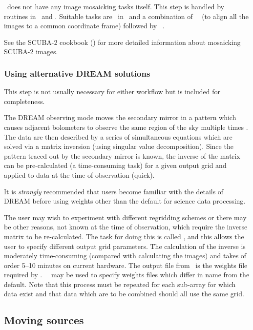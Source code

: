 \documentclass[oneside,11pt]{starlink}
\begin{document}
\SMURF\ does not have any image mosaicking tasks itself. This step is
handled by routines in \KAPPA\ and \CCDPACK. Suitable tasks are
\wcsmosaic\ in \KAPPA\ and a combination of \KAPPA\ \wcsalign\ (to
align all the images to a common coordinate frame) followed by
\CCDPACK\ \makemos.

See the SCUBA-2 cookbook (\SMURFcook) for more detailed information
about mosaicking SCUBA-2 images.

\subsubsection{Using alternative DREAM solutions\label{se:dream}}

This step is not usually necessary for either workflow but is included
for completeness.

The DREAM observing mode moves the secondary mirror in a pattern which
causes adjacent bolometers to observe the same region of the sky
multiple times \cite{scuba2,dream}. The data are then described by a
series of simultaneous equations which are solved via a matrix
inversion (using singular value decomposition). Since the pattern
traced out by the secondary mirror is known, the inverse of the matrix
can be pre-calculated (a time-consuming task) for a given output grid
and applied to data at the time of observation (quick).

It is \emph{strongly} recommended that users become familiar with the
details of DREAM \cite{dream} before using weights other than the
default for science data processing.

The user may wish to experiment with different regridding schemes or
there may be other reasons, not known at the time of observation,
which require the inverse matrix to be re-calculated. The task for
doing this is called \dreamweights, and this allows the user to
specify different output grid parameters. The calculation of the
inverse is moderately time-consuming (compared with calculating the
images) and takes of order 5--10 minutes on current hardware. The
output file from \dreamweights\ is the weights file required by
\dreamsolve. \KAPPA\ \fitsedit\ may be used to specify weights files
which differ in name from the default. Note that this process must be
repeated for each sub-array for which data exist and that data which
are to be combined should all use the same grid.

\subsection{Moving sources}
\end{document}
